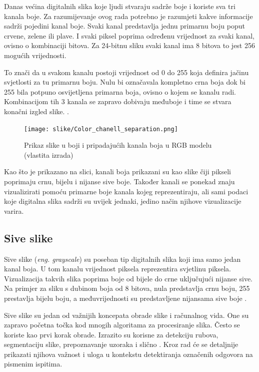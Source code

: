 \documentclass{foi}
\begin{document}
Danas većina digitalnih slika koje ljudi stvaraju sadrže boje i koriste sva tri kanala boje. Za razumijevanje ovog rada potrebno je razumjeti kakve informacije sadrži pojedini kanal boje. Svaki kanal predstavlja jednu primarnu boju poput crvene, zelene ili plave. I svaki piksel poprima određenu vrijednost za svaki kanal, ovisno o kombinaciji bitova. Za 24-bitnu sliku svaki kanal ima 8 bitova to jest 256 mogućih vrijednosti. 

To znači da u svakom kanalu postoji vrijednost od 0 do 255 koja definira jačinu svjetlosti za tu primarnu boju. Nulu bi označavala kompletno crna boja dok bi 255 bila potpuno osvijetljena primarna boja,  ovisno o kojem se kanalu radi. Kombinacijom tih 3 kanala se zapravo dobivaju međuboje i time se stvara konačni izgled slike. \cite{GrayscaleSlika}.

\begin{figure}[H]
    \centering
    \texttt{[image: slike/Color\_chanell\_separation.png]}
    \caption{Prikaz slike u boji i pripadajućih kanala boja u RGB modelu (vlastita izrada)}
    \label{fig:channels}
\end{figure}

Kao što je prikazano na slici, kanali boja prikazani su kao slike čiji pikseli poprimaju crnu, bijelu i nijanse sive boje. Također kanali se ponekad znaju vizualizirati pomoću primarne boje kanala kojeg reprezentiraju, ali sami podaci koje digitalna slika sadrži su uvijek jednaki, jedino način njihove vizualizacije varira. 

\subsection{Sive slike}

Sive slike (\textit{eng. grayscale}) su poseban tip digitalnih slika koji ima samo jedan kanal boja. U tom kanalu vrijednost piksela reprezentira svjetlinu piksela. Vizualizacija takvih slika poprima boje od bijele do crne uključujući nijanse sive. Na primjer za sliku s dubinom boja od 8 bitova, nula predstavlja crnu boju, 255 prestavlja bijelu boju, a međuvrijednosti su predstavljene nijansama sive boje \cite{GrayscaleSlika}.

Sive slike su jedan od važnijih koncepata obrade slike i računalnog vida. One su zapravo početna točka kod mnogih algoritama za procesiranje slika. Često se koriste kao prvi korak obrade. Izrazito su korisne za detekciju rubova, segmentaciju slike, prepoznavanje uzoraka i slično \cite{Grayscale2}. Kroz rad će se detaljnije prikazati njihova važnost i uloga u kontekstu detektiranja označenih odgovora na pismenim ispitima. 
\end{document}
